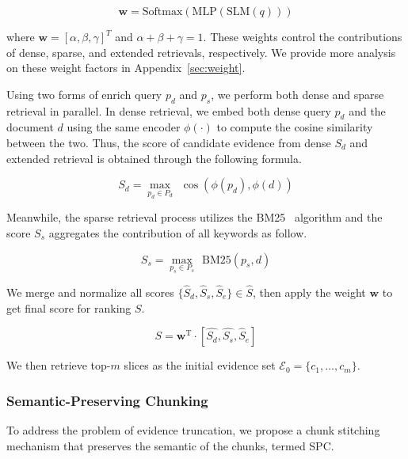 \begin{equation}
\textbf{w}=\text{Softmax}\left(\text{MLP}\left(\text{SLM}\left(q\right)\right)\right)
\end{equation}

\noindent
where $\textbf{w}=\left[\alpha,\beta,\gamma\right]^T$ and $\alpha +\beta+\gamma=1$. 
These weights control the contributions of dense, sparse, and extended retrievals, respectively.
We provide more analysis on these weight factors in Appendix~\ref{sec:weight}.


Using two forms of enrich query $p_d$ and $p_s$, we perform both dense and sparse retrieval in parallel.
In dense retrieval, we embed both dense query $p_d$ and the document $d$ using the same encoder $\phi(\cdot)$ to compute the cosine similarity between the two.
Thus, the score of candidate evidence from dense $S_d$ and extended retrieval is obtained through the following formula.

\begin{equation}
S_d=\underset{p_d \in P_d}{\max} \hspace{5pt} \cos \left(\phi\left(p_d\right), \phi\left(d\right)\right)
\end{equation}

\noindent
Meanwhile, the sparse retrieval process utilizes the BM25~\cite{robertson2009probabilistic} algorithm and the score $S_s$ aggregates the contribution of all keywords as follow.

\begin{equation}
S_s=\underset{p_s \in P_s}{\max} \hspace{5pt} \text{BM25} \left(p_s, d\right)
\end{equation}

\noindent
We merge and normalize all scores $\{\hat{S}_d, \hat{S}_s, \hat{S}_e\} \in \hat{S}$, then apply the weight $\textbf{w}$ to get final score for ranking $S$. 

\begin{equation}
S=\textbf{w}^\text{T} \cdot \left[\hat{S_d}, \hat{S_s}, \hat{S}_e\right]
\end{equation}

\noindent
We then retrieve top-$m$ slices as the initial evidence set $\mathcal{E}_0=\{c_1, \dots, c_m\}$.



\subsubsection{Semantic-Preserving Chunking}\label{sec:SPC}
To address the problem of evidence truncation, we propose a chunk stitching mechanism that preserves the semantic of the chunks, termed SPC.

